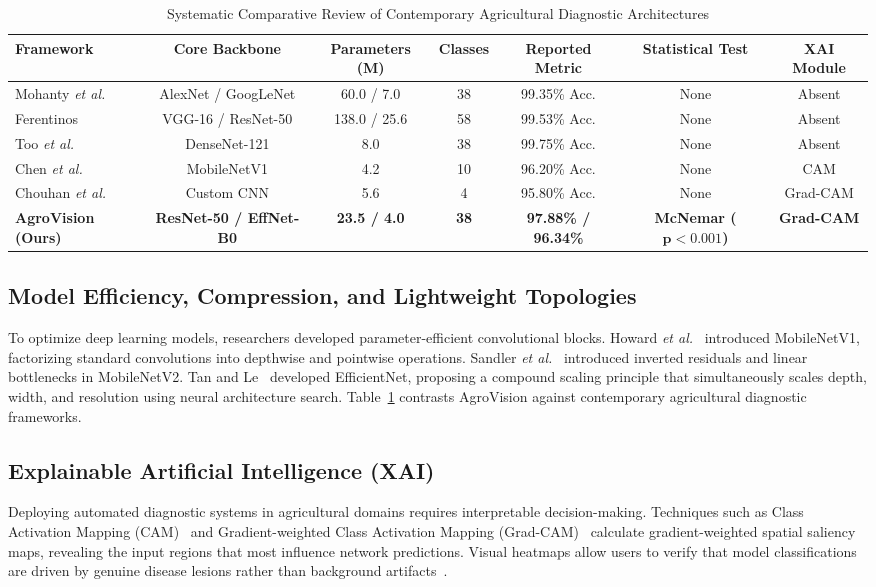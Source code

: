 \documentclass[journal]{IEEEtran}
\begin{document}
\begin{table}[t]
\caption{Systematic Comparative Review of Contemporary Agricultural Diagnostic Architectures}
\label{tab:lit_comparison}
\centering
\begin{tabular*}{\textwidth}{@{\extracolsep{\fill}}lcccccc}
\toprule
\textbf{Framework} & \textbf{Core Backbone} & \textbf{Parameters (M)} & \textbf{Classes} & \textbf{Reported Metric} & \textbf{Statistical Test} & \textbf{XAI Module} \\
\midrule
Mohanty \textit{et al.}~\cite{mohanty2016} & AlexNet / GoogLeNet & 60.0 / 7.0 & 38 & 99.35\% Acc. & None & Absent \\
Ferentinos~\cite{ferentinos2018} & VGG-16 / ResNet-50 & 138.0 / 25.6 & 58 & 99.53\% Acc. & None & Absent \\
Too \textit{et al.}~\cite{too2019} & DenseNet-121 & 8.0 & 38 & 99.75\% Acc. & None & Absent \\
Chen \textit{et al.}~\cite{chen2020} & MobileNetV1 & 4.2 & 10 & 96.20\% Acc. & None & CAM \\
Chouhan \textit{et al.}~\cite{chouhan2020} & Custom CNN & 5.6 & 4 & 95.80\% Acc. & None & Grad-CAM \\
\textbf{AgroVision (Ours)} & \textbf{ResNet-50 / EffNet-B0} & \textbf{23.5 / 4.0} & \textbf{38} & \textbf{97.88\% / 96.34\%} & \textbf{McNemar ($\mathbf{p < 0.001}$)} & \textbf{Grad-CAM} \\
\bottomrule
\end{tabular*}
\end{table}

\subsection{Model Efficiency, Compression, and Lightweight Topologies}
To optimize deep learning models, researchers developed parameter-efficient convolutional blocks. Howard \textit{et al.}~\cite{howard2017} introduced MobileNetV1, factorizing standard convolutions into depthwise and pointwise operations. Sandler \textit{et al.}~\cite{sandler2018} introduced inverted residuals and linear bottlenecks in MobileNetV2. Tan and Le~\cite{tan2019} developed EfficientNet, proposing a compound scaling principle that simultaneously scales depth, width, and resolution using neural architecture search. Table~\ref{tab:lit_comparison} contrasts AgroVision against contemporary agricultural diagnostic frameworks.

\subsection{Explainable Artificial Intelligence (XAI)}
Deploying automated diagnostic systems in agricultural domains requires interpretable decision-making. Techniques such as Class Activation Mapping (CAM)~\cite{zhou2016} and Gradient-weighted Class Activation Mapping (Grad-CAM)~\cite{selvaraju2017} calculate gradient-weighted spatial saliency maps, revealing the input regions that most influence network predictions. Visual heatmaps allow users to verify that model classifications are driven by genuine disease lesions rather than background artifacts~\cite{chouhan2020, singh2020}.
\end{document}
